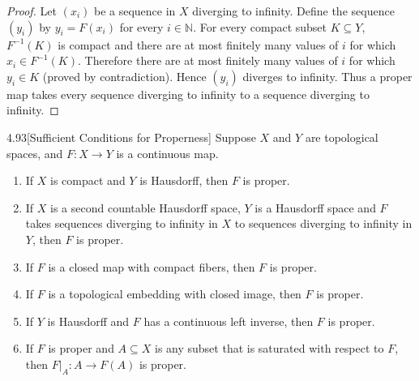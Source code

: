 \begin{proof}
	Let ${(x_{i})}$ be a sequence in $X$ diverging to infinity. Define the sequence ${(y_{i})}$ by $y_{i} = F(x_{i})$ for every $i\in\mathbb{N}$. For every compact subset $K\subseteq Y$, $F^{-1}(K)$ is compact and there are at most finitely many values of $i$ for which $x_{i} \in F^{-1}(K)$. Therefore there are at most finitely many values of $i$ for which $y_{i} \in K$ (proved by contradiction). Hence ${(y_{i})}$ diverges to infinity. Thus a proper map takes every sequence diverging to infinity to a sequence diverging to infinity.
\end{proof}

\begin{prop}{4.93}[Sufficient Conditions for Properness] Suppose $X$ and $Y$ are topological spaces, and $F: X\to Y$ is a continuous map.
	\begin{enumerate}[label={(\alph*)}]
		\item If $X$ is compact and $Y$ is Hausdorff, then $F$ is proper.
		\item If $X$ is a second countable Hausdorff space, $Y$ is a Hausdorff space and $F$ takes sequences diverging to infinity in $X$ to sequences diverging to infinity in $Y$, then $F$ is proper.
		\item If $F$ is a closed map with compact fibers, then $F$ is proper.
		\item If $F$ is a topological embedding with closed image, then $F$ is proper.
		\item If $Y$ is Hausdorff and $F$ has a continuous left inverse, then $F$ is proper.
		\item If $F$ is proper and $A \subseteq X$ is any subset that is saturated with respect to $F$, then $F\vert_{A}: A \to F(A)$ is proper.
	\end{enumerate}
\end{prop}

